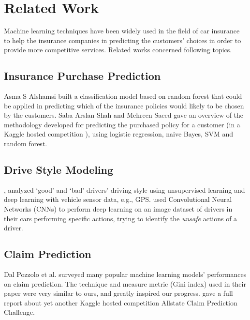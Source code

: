 \documentclass{standalone}
\begin{document}
\section{Related Work}\label{related}

Machine learning techniques have been widely used in the field of car insurance
to help the insurance companies in predicting the customers' choices in order
to provide more competitive services. Related works concerned following topics.

\subsection{Insurance Purchase Prediction}

Asma S Alshamsi \cite{alshamsi2014predicting} built a classification model
based on random forest that could be applied in predicting which of the
insurance policies would likely to be chosen by the customers. Saba Arslan Shah
and Mehreen Saeed \cite{shahpredicting} gave an overview of the methodology
developed for predicting the purchased policy for a customer (in a Kaggle
hosted competition \cite{kaggle:allstatepurchase}), using logistic regression,
naive Bayes, SVM and random forest.

\subsection{Drive Style Modeling}

\cite{dong2016characterizing}, \cite{nikulin2016driving} analyzed `good' and
`bad' drivers' driving style using unsupervised learning and deep learning with
vehicle sensor data, e.g., GPS. \cite{singhusing} used Convolutional Neural
Networks (CNNs) to perform deep learning on an image dataset  of drivers in
their cars performing specific actions, trying to identify the \emph{unsafe}
actions of a driver.

\subsection{Claim Prediction}

Dal Pozzolo et al. \cite{dal2010comparison} surveyed many popular machine
learning models' performances on claim prediction. The technique and measure
metric (Gini index) used in their paper were very similar to ours, and greatly
inspired our progress. \cite{huangfu2015data} gave a full report about yet
another Kaggle hosted competition Allstate Claim Prediction
Challenge\cite{kaggle:allstate}.
\end{document}
